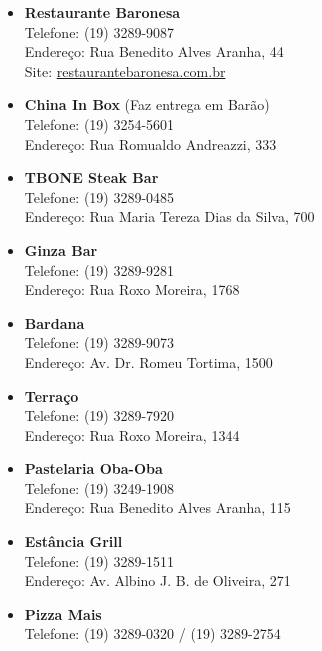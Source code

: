 \begin{itemize}
    \item   \textbf{Restaurante Baronesa}
        \\Telefone: (19) 3289-9087
        \\Endereço: Rua Benedito Alves Aranha, 44
        \\Site: \url{restaurantebaronesa.com.br}

    \item   \textbf{China In Box} (Faz entrega em Barão)
        \\Telefone: (19) 3254-5601
        \\Endereço: Rua Romualdo Andreazzi, 333

    \item   \textbf{TBONE Steak Bar}
        \\Telefone: (19) 3289-0485
        \\Endereço: Rua Maria Tereza Dias da Silva, 700

    \item   \textbf{Ginza Bar}
        \\Telefone: (19) 3289-9281
        \\Endereço: Rua Roxo Moreira, 1768

    \item   \textbf{Bardana}
        \\Telefone: (19) 3289-9073
        \\Endereço: Av. Dr. Romeu Tortima, 1500

    \item   \textbf{Terraço}
        \\Telefone: (19) 3289-7920
        \\Endereço: Rua Roxo Moreira, 1344

    \item   \textbf{Pastelaria Oba-Oba}
        \\Telefone: (19) 3249-1908
        \\Endereço: Rua Benedito Alves Aranha, 115

    \item   \textbf{Estância Grill}
        \\Telefone: (19) 3289-1511
        \\Endereço: Av. Albino J. B. de Oliveira, 271
        
    \item   \textbf{Pizza Mais}
        \\Telefone: (19) 3289-0320 / (19) 3289-2754


\end{itemize}
